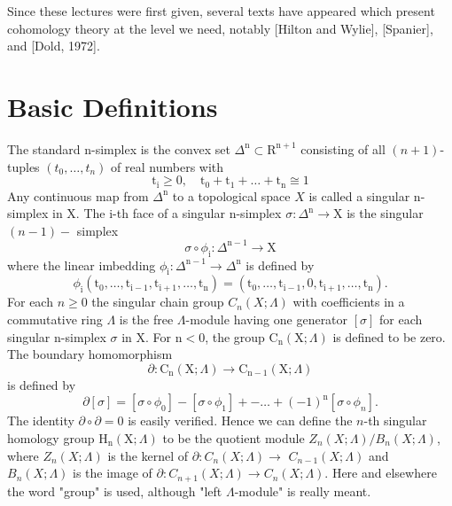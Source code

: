 \documentclass[10pt]{article}
\begin{document}
Since these lectures were first given, several texts have appeared which present cohomology theory at the level we need, notably [Hilton and Wylie], [Spanier], and [Dold, 1972].

\section{Basic Definitions}
The standard $\mathrm{n}$-simplex is the convex set $\Delta^{\mathrm{n}} \subset \mathrm{R}^{\mathrm{n}+1}$ consisting of all $(n+1)$-tuples $\left(t_{0}, \ldots, t_{n}\right)$ of real numbers with
$$
\mathrm{t}_{\mathrm{i}} \geq 0, \quad \mathrm{t}_{0}+\mathrm{t}_{1}+\ldots+\mathrm{t}_{\mathrm{n}} \cong 1
$$
Any continuous map from $\Delta^{\mathrm{n}}$ to a topological space $X$ is called a singular $\mathrm{n}$-simplex in $\mathrm{X}$. The $\mathrm{i}$-th face of a singular $\mathrm{n}$-simplex $\sigma: \Delta^{\mathrm{n}} \rightarrow \mathrm{X}$ is the singular $(n-1)-$ simplex
$$
\sigma \circ \phi_{\mathrm{i}}: \Delta^{\mathrm{n}-1} \rightarrow \mathrm{X}
$$
where the linear imbedding $\phi_{\mathrm{i}}: \Delta^{\mathrm{n}-1} \rightarrow \Delta^{\mathrm{n}}$ is defined by
$$
\phi_{\mathrm{i}}\left(\mathrm{t}_{0}, \ldots, \mathrm{t}_{\mathrm{i}-1}, \mathrm{t}_{\mathrm{i}+1}, \ldots, \mathrm{t}_{\mathrm{n}}\right)=\left(\mathrm{t}_{0}, \ldots, \mathrm{t}_{\mathrm{i}-1}, 0, \mathrm{t}_{\mathrm{i}+1}, \ldots, \mathrm{t}_{\mathrm{n}}\right) .
$$
For each $n \geq 0$ the singular chain group $C_{n}(X ; \Lambda)$ with coefficients in a commutative ring $\Lambda$ is the free $\Lambda$-module having one generator $[\sigma]$ for each singular $\mathrm{n}$-simplex $\sigma$ in $\mathrm{X}$. For $\mathrm{n}<0$, the group $\mathrm{C}_{\mathrm{n}}(\mathrm{X} ; \Lambda)$ is defined to be zero. The boundary homomorphism
$$
\partial: \mathrm{C}_{\mathrm{n}}(\mathrm{X} ; \Lambda) \rightarrow \mathrm{C}_{\mathrm{n}-1}(\mathrm{X} ; \Lambda)
$$
is defined by
$$
\partial[\sigma]=\left[\sigma \circ \phi_{0}\right]-\left[\sigma \circ \phi_{1}\right]+-\ldots+(-1)^{\mathrm{n}}\left[\sigma \circ \phi_{n}\right] .
$$
The identity $\partial \circ \partial=0$ is easily verified. Hence we can define the $n$-th singular homology group $\mathrm{H}_{\mathrm{n}}(\mathrm{X} ; \Lambda)$ to be the quotient module $Z_{n}(X ; \Lambda) / B_{n}(X ; \Lambda)$, where $Z_{n}(X ; \Lambda)$ is the kernel of $\partial: C_{n}(X ; \Lambda) \rightarrow$ $C_{n-1}(X ; \Lambda)$ and $B_{n}(X ; \Lambda)$ is the image of $\partial: C_{n+1}(X ; \Lambda) \rightarrow C_{n}(X ; \Lambda)$. Here and elsewhere the word "group" is used, although "left $\Lambda$-module" is really meant.
\end{document}
